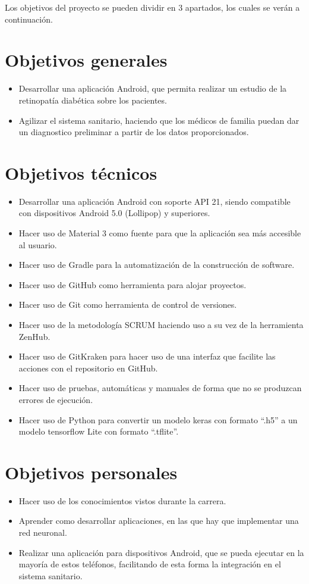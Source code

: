 
Los objetivos del proyecto se pueden dividir en 3 apartados, los cuales se verán a continuación. 
\section{Objetivos generales}
\begin{itemize}
    \item Desarrollar una aplicación Android, que permita realizar un estudio de la retinopatía diabética sobre los pacientes.
    \item Agilizar el sistema sanitario, haciendo que los médicos de familia puedan dar un diagnostico preliminar a partir de los datos proporcionados.

\end{itemize}
\section{Objetivos técnicos}
\begin{itemize}
    \item Desarrollar una aplicación Android con soporte API 21, siendo compatible con dispositivos Android 5.0 (Lollipop) y superiores.
    \item Hacer uso de Material 3 como fuente para que la aplicación sea más accesible al usuario.
    \item Hacer uso de Gradle para la automatización de la construcción de software.
    \item Hacer uso de GitHub como herramienta para alojar proyectos.
    \item Hacer uso de Git como herramienta de control de versiones.
    \item Hacer uso de la metodología SCRUM haciendo uso a su vez de la herramienta ZenHub.
    \item Hacer uso de GitKraken para hacer uso de una interfaz que facilite las acciones con el repositorio en GitHub.
    \item Hacer uso de pruebas, automáticas y manuales de forma que no se produzcan errores de ejecución.
    \item Hacer uso de Python para convertir un modelo keras con formato ``.h5'' a un modelo tensorflow Lite con formato ``.tflite''.
    
\end{itemize}
\section{Objetivos personales}
\begin{itemize}
    \item Hacer uso de los conocimientos vistos durante la carrera.
    \item Aprender como desarrollar aplicaciones, en las que hay que implementar una red neuronal.
    \item Realizar una aplicación para dispositivos Android, que se pueda ejecutar en la mayoría de estos teléfonos, facilitando de esta forma la integración en el sistema sanitario.
    
\end{itemize}